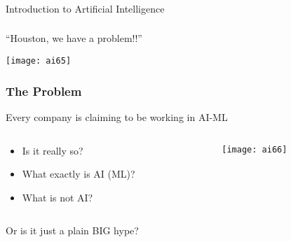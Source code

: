 \begin{frame}[fragile]\frametitle{}
\begin{center}
{\Large Introduction to Artificial Intelligence}
\end{center}
\end{frame}
 
\begin{frame}[fragile]\frametitle{}
\begin{center}
{\Large ``Houston, we have a problem!!''}
\end{center}


			\begin{center}
			\texttt{[image: ai65]}
			\end{center}
			
\end{frame}

\begin{frame}[fragile]\frametitle{The Problem}
Every company is claiming to be working in AI-ML

\begin{columns}
    \begin{column}[T]{0.6\linewidth}

\begin{itemize}
\item Is it really so?
\item What exactly is AI (ML)?
\item What is not AI?
\end{itemize}

    \end{column}
    \begin{column}[T]{0.4\linewidth}

			\begin{center}
			\texttt{[image: ai66]}
			\end{center}
			
    \end{column}
  \end{columns}
  
Or is it just a plain BIG hype?
\end{frame}



